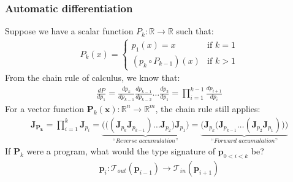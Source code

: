 \documentclass{beamer}
\begin{document}
    \begin{frame}
        \frametitle{Automatic differentiation}
        Suppose we have a scalar function $P_k: \mathbb{R}\rightarrow\mathbb{R}$ such that:
        \begin{align*}
            P_k(x) = \begin{cases} p_1(x) = x &\text{if } k=1\\ (p_k\circ P_{k-1})(x)&\text{if } k > 1 \end{cases}
        \end{align*}
        From the chain rule of calculus, we know that:
        \begin{align*}
            \frac{dP}{dp_1} = \frac{dp_k}{dp_{k-1}}\frac{dp_{k-1}}{dp_{k-2}}\dots\frac{dp_2}{dp_1}= {\displaystyle \prod_{i=1}^{k-1} \frac{dp_{i+1}}{dp_{i}}}
        \end{align*}
        For a vector function $\mathbf{P}_k(\mathbf{x}): \mathbb{R}^n\rightarrow\mathbb{R}^m$, the chain rule still applies:
        \begin{align*}
            \mathbf{J}_\mathbf{P_k} = \displaystyle \prod_{i=1}^{k} \mathbf{J}_{p_i} = \underbrace{\bigg(\Big((\mathbf{J}_{p_k} \mathbf{J}_{p_{k-1}}) \dots \mathbf{J}_{p_2}\Big) \mathbf{J}_{p_1}\bigg)}_{\textit{``Reverse accumulation''}} = \underbrace{\bigg(\mathbf{J}_{p_k} \Big(\mathbf{J}_{p_{k-1}} \dots (\mathbf{J}_{p_2} \mathbf{J}_{p_1})\Big)\bigg)}_{\textit{``Forward accumulation''}}
        \end{align*}
        If $\mathbf{P}_{k}$ were a program, what would the type signature of $\mathbf{p}_{0<i<k}$ be?
        \begin{align*}
            \mathbf{p}_i: \mathcal{T}_{out}(\mathbf{p}_{i-1}) \rightarrow \mathcal{T}_{in}(\mathbf{p}_{i+1})
        \end{align*}
    \end{frame}

\end{document}
